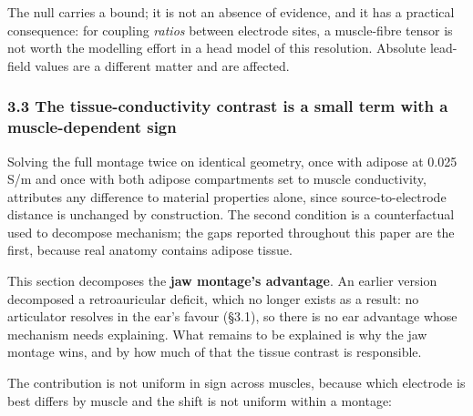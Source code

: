 \documentclass[manuscript,review,anonymous]{acmart}
\begin{document}
The null carries a bound; it is not an absence of evidence, and it has a
practical consequence: for coupling \emph{ratios} between electrode sites, a
muscle-fibre tensor is not worth the modelling effort in a head model of this
resolution. Absolute lead-field values are a different matter and are affected.

\subsubsection{3.3 The tissue-conductivity contrast is a small term with a muscle-dependent sign}\label{the-tissue-conductivity-contrast-is-a-small-term-with-a-muscle-dependent-sign}

Solving the full montage twice on identical geometry, once with adipose at
0.025 S/m and once with both adipose compartments set to muscle conductivity,
attributes any difference to material properties alone, since source-to-electrode
distance is unchanged by construction. The second condition is a counterfactual
used to decompose mechanism; the gaps reported throughout this paper are the
first, because real anatomy contains adipose tissue.

This section decomposes the \textbf{jaw montage's advantage}. An earlier version
decomposed a retroauricular deficit, which no longer exists as a result: no
articulator resolves in the ear's favour (\S{}3.1), so there is no ear advantage
whose mechanism needs explaining. What remains to be explained is why the jaw
montage wins, and by how much of that the tissue contrast is responsible.

The contribution is not uniform in sign across muscles, because which electrode
is best differs by muscle and the shift is not uniform within a montage:
\end{document}
